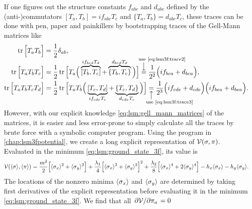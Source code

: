 If one figures out the structure constants $f_{abc}$ and $d_{abc}$
defined by the (anti-)commutators $[T_a,T_b]=i f_{abc} T_c$ and $\{T_a,T_b\}=d_{abc} T_c$,
these traces can be done with pen, paper and painkillers
by bootstrapping traces of the Gell-Mann matrices like
\begin{subequations}
\begin{align}
	\trace\Big[T_a T_b\Big] &= \frac{1}{2} \delta_{ab} \label{eq:lsm3f:trace2}, \\
	\trace\Big[T_a T_b T_c\Big] &= \frac{1}{2} \trace\Big[T_a\Big(\overbrace{[T_b,T_c]}^{\smash{i f_{bcd} T_d}}+\overbrace{\{T_b,T_c\}}^{\smash{d_{bcd} T_d}}\Big)\Big]
	                             \equalexplabove{\smash[t]{use \eqref{eq:lsm3f:trace2}}} \frac{1}{2^2} \Big( i f_{bca} + d_{bca} \Big), \label{eq:lsm3f:trace3} \\
	\trace\Big[T_a T_b T_c T_d\Big] &= \frac{1}{2} \trace\Big[T_a T_b \Big( \underbrace{[T_c,T_d]}_{\smash{i f_{cde} T_e}} + \underbrace{\{T_c,T_d\}}_{\smash{d_{cde} T_e}} \Big) \Big]
	                                 \equalexplbelow{\smash[b]{use \eqref{eq:lsm3f:trace3}}} \frac{1}{2^3} \Big( i f_{cde} + d_{cde} \Big) \Big( i f_{bea} + d_{bea} \Big). \label{eq:lsm3f:trace4}
\end{align}
\end{subequations}
However, with our explicit knowledge \eqref{eq:lsm:gell_mann_matrices} of the matrices,
it is easier and less error-prone to simply calculate all the traces by brute force with a symbolic computer program.
Using the program in \cref{chap:lsm3fpotential},
we create a long explicit representation of $\mathcal{V}(\sigma,\pi)$.
Evaluated in the minimum \eqref{eq:lsm:ground_state_3f}, its value is
\begin{equation}
	\mathcal{V}(\langle \sigma \rangle,\langle \pi \rangle) = \frac{m^2}{2} \Big[ \langle \sigma_x \rangle^2 + \langle \sigma_y \rangle^2 \Big] + \frac{\lambda_1}{4} \Big[ \langle \sigma_x \rangle^2 + \langle \sigma_y \rangle^2 \Big]^2 + \frac{\lambda_2}{8} \Big[ \langle \sigma_x \rangle^4 + 2 \langle \sigma_y \rangle^4 \Big] - h_x \langle \sigma_x \rangle - h_y \langle \sigma_y \rangle.
\label{eq:lsm:potential_tree_3f}
\end{equation}
The locations of the nonzero minima $\langle \sigma_x \rangle$ and $\langle \sigma_y \rangle$ are determined
by taking first derivatives of the explicit representation before evaluating it in the minimum \eqref{eq:lsm:ground_state_3f}.
We find that all $\pdv{\mathcal{V}}/{\pi_a}=0$

